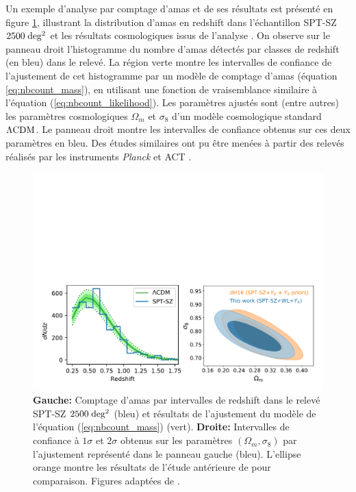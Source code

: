 Un exemple d'analyse par comptage d'amas et de ses résultats est présenté en figure \ref{fig:nbcount_bocquet}, illustrant la distribution d'amas en redshift dans l'échantillon SPT-SZ $2500 \;{\rm deg^2}$ \cite{bleem_galaxy_2015} et les résultats cosmologiques issus de l'analyse \cite{bocquet_cluster_2019}.
On observe sur le panneau droit l'histogramme du nombre d'amas détectés par classes de redshift (en bleu) dans le relevé.
La région verte montre les intervalles de confiance de l'ajustement de cet histogramme par un modèle de comptage d'amas (équation \ref{eq:nbcount_mass}), en utilisant une fonction de vraisemblance similaire à l'équation (\ref{eq:nbcount_likelihood}).
Les paramètres ajustés sont (entre autres) les paramètres cosmologiques $\Omega_m$ et $\sigma_8$ d'un modèle cosmologique standard $\Lambda{\rm CDM}$.
Le panneau droit montre les intervalles de confiance obtenus sur ces deux paramètres en bleu.
Des études similaires ont pu être menées à partir des relevés réalisés par les instruments \textit{Planck} \cite{planck_collaboration_planck_2016-2} et ACT \cite{hilton_atacama_2021}.

\begin{figure}[t]
    \centering
    \includegraphics[width=\linewidth]{Figures/Chap_amas/bocquet.pdf}
    \caption{
        \textbf{Gauche:} Comptage d'amas par intervalles de redshift dans le relevé SPT-SZ $2500 \;{\rm deg^2}$ (bleu) et résultats de l'ajustement du modèle de l'équation (\ref{eq:nbcount_mass}) (vert).
        \textbf{Droite:} Intervalles de confiance à $1\sigma$ et $2\sigma$ obtenus sur les paramètres $(\Omega_m, \sigma_8)$ par l'ajustement représenté dans le panneau gauche (bleu).
        L'ellipse orange montre les résultats de l'étude antérieure de \cite{de_haan_cosmological_2016} pour comparaison.
        Figures adaptées de \cite{bocquet_cluster_2019}.
    }
    \label{fig:nbcount_bocquet}
\end{figure}

